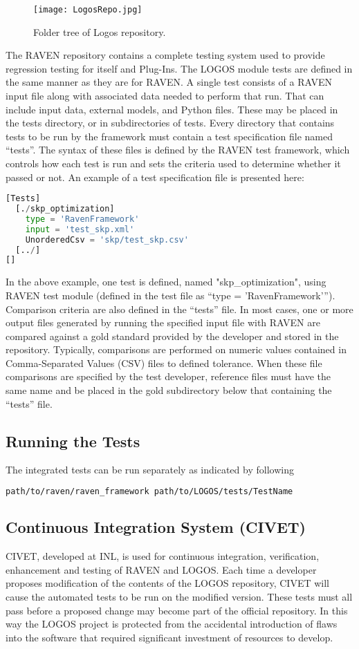 \begin{figure}
    \centering
    \centerline{\texttt{[image: LogosRepo.jpg]}}
    \caption{Folder tree of Logos repository.}
    \label{fig:Logos}
\end{figure}

The RAVEN repository contains a complete testing system used to provide regression
testing for itself and Plug-Ins. The LOGOS module tests are defined in the
same manner as they are for RAVEN. A single test consists of a RAVEN input file
along with associated data needed to perform that run. That can include input data,
external models, and Python files. These may be placed in the tests directory,
or in subdirectories of tests. Every directory that contains tests to be run by
the framework must contain a test specification file named “tests”. The syntax of
these files is defined by the RAVEN test framework, which controls how each test
is run and sets the criteria used to determine whether it passed or not. An example
of a test specification file is presented here:
\begin{lstlisting}[language=python]
[Tests]
  [./skp_optimization]
    type = 'RavenFramework'
    input = 'test_skp.xml'
    UnorderedCsv = 'skp/test_skp.csv'
  [../]
[]
\end{lstlisting}
In the above example, one test is defined, named "skp\_optimization", using RAVEN
test module (defined in the test file as “type = 'RavenFramework'”). Comparison
criteria are also defined in the “tests” file. In most cases, one or more output
files generated by running the specified input file with RAVEN are compared
against a gold standard provided by the developer and stored in the repository.
Typically, comparisons are performed on numeric values contained in Comma-Separated
Values (CSV) files to defined tolerance. When these file comparisons are specified
by the test developer, reference files must have the same name and be placed
in the gold subdirectory below that containing the “tests” file.

\subsection{Running the Tests}
The integrated tests can be run separately as indicated by following
\begin{lstlisting}[language=bash]
path/to/raven/raven_framework path/to/LOGOS/tests/TestName
\end{lstlisting}

\subsection{Continuous Integration System (CIVET)}
CIVET, developed at INL, is used for continuous integration, verification,
enhancement and testing of RAVEN and LOGOS. Each time a developer
proposes modification of the contents of the LOGOS repository, CIVET will cause
the automated tests to be run on the modified version. These tests must all pass
before a proposed change may become part of the official repository. In this way
the LOGOS project is protected from the accidental introduction of flaws into
the software that required significant investment of resources to develop.

